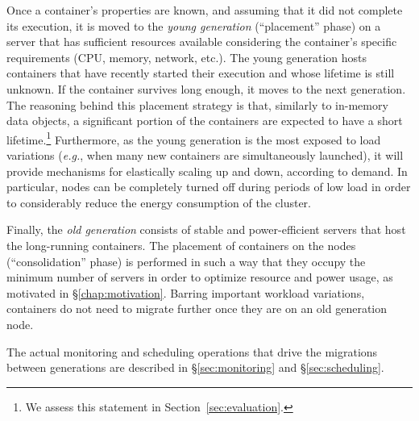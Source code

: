 Once a container's properties are known, and assuming that it did not complete its execution, it is moved to the \emph{young generation} (``placement'' phase) on a server that has sufficient resources available considering the container's specific requirements (CPU, memory, network, etc.).
The young generation hosts containers that have recently started their execution and whose lifetime is still unknown.
If the container survives long enough, it moves to the next generation.
The reasoning behind this placement strategy is that, similarly to in-memory data objects, a significant portion of the containers are expected to have a short lifetime.\footnote{We assess this statement in Section~\ref{sec:evaluation}.}
Furthermore, as the young generation is the most exposed to load variations (\emph{e.g.}, when many new containers are simultaneously launched), it will provide mechanisms for elastically scaling up and down, according to demand.
In particular, nodes can be completely turned off during periods of low load in order to considerably reduce the energy consumption of the cluster.

Finally, the \emph{old generation} consists of stable and power-efficient servers that host the long-running containers.
The placement of containers on the nodes (``consolidation'' phase) is performed in such a way that they occupy the minimum number of servers in order to optimize resource and power usage, as motivated in \S\ref{chap:motivation}.
Barring important workload variations, containers do not need to migrate further once they are on an old generation node.

The actual monitoring and scheduling operations that drive the migrations between generations are described in \S\ref{sec:monitoring} and \S\ref{sec:scheduling}.
